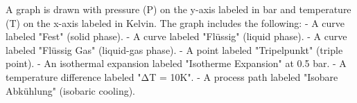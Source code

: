 A graph is drawn with pressure (P) on the y-axis labeled in bar and temperature (T) on the x-axis labeled in Kelvin. The graph includes the following:  
- A curve labeled "Fest" (solid phase).  
- A curve labeled "Flüssig" (liquid phase).  
- A curve labeled "Flüssig Gas" (liquid-gas phase).  
- A point labeled "Tripelpunkt" (triple point).  
- An isothermal expansion labeled "Isotherme Expansion" at 0.5 bar.  
- A temperature difference labeled "ΔT = 10K".  
- A process path labeled "Isobare Abkühlung" (isobaric cooling).